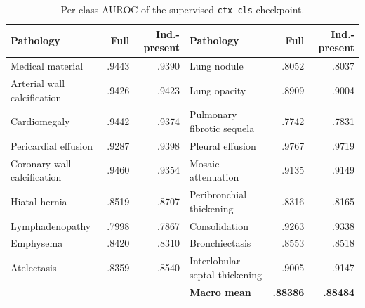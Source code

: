 \documentclass[10pt,twocolumn]{article}
\begin{document}
\begin{table}[t]
\centering
\caption{Per-class AUROC of the supervised \texttt{ctx\_cls} checkpoint.}
\label{tab:ctxclsclass}
\begin{tabular}{@{}lrr@{\hspace{1.4cm}}lrr@{}}
\toprule
Pathology & Full & Ind.-present & Pathology & Full & Ind.-present \\
\midrule
Medical material & .9443 & .9390 & Lung nodule & .8052 & .8037 \\
Arterial wall calcification & .9426 & .9423 & Lung opacity & .8909 & .9004 \\
Cardiomegaly & .9442 & .9374 & Pulmonary fibrotic sequela & .7742 & .7831 \\
Pericardial effusion & .9287 & .9398 & Pleural effusion & .9767 & .9719 \\
Coronary wall calcification & .9460 & .9354 & Mosaic attenuation & .9135 & .9149 \\
Hiatal hernia & .8519 & .8707 & Peribronchial thickening & .8316 & .8165 \\
Lymphadenopathy & .7998 & .7867 & Consolidation & .9263 & .9338 \\
Emphysema & .8420 & .8310 & Bronchiectasis & .8553 & .8518 \\
Atelectasis & .8359 & .8540 & Interlobular septal thickening & .9005 & .9147 \\
\midrule
\multicolumn{3}{c}{} & \textbf{Macro mean} & \textbf{.88386} & \textbf{.88484} \\
\bottomrule
\end{tabular}
\end{table}



\end{document}
